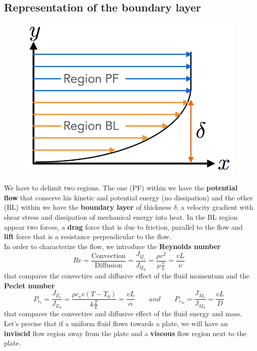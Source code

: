 \newpage
	
\subsection{Representation of the boundary layer}
\begin{figure}
	\vspace{-5mm}
	\includegraphics[scale=0.3]{ch1/11}
\end{figure}
We have to delimit two regions. The one (PF) within we have the \textbf{potential flow} that conserve his kinetic and potential energy (no dissipation) and the other (BL) within we have the \textbf{boundary layer} of thickness $\delta$, a velocity gradient with shear stress and dissipation of mechanical energy into heat. In the BL region appear two forces, a \textbf{drag} force that is due to friction, parallel to the flow and \textbf{lift} force that is a resistance perpendicular to the flow.  \\
In order to characterize the flow, we introduce the \textbf{Reynolds number}\\
\begin{equation}
	Re = \frac{\mbox{Convection}}{\mbox{Diffusion}} = \frac{J_{Q_c}}{J_{Q_d}} = \frac{\rho v^2}{\mu \frac{v}{L}} = \frac{vL}{\nu}
\end{equation}
that compares the convective and diffusive effect of the fluid momentum and the \textbf{Peclet number}
\begin{equation}
	P_{e_t} = \frac{J_{E_c}}{J_{E_d}} = \frac{\rho c_v v (T- T_0)}{k\frac{T}{L}} = \frac{vL}{\alpha} 
	\qquad and \qquad 
	P_{e_m} = \frac{J_{M_c}}{J_{M_d}} = \frac{vL}{D} 	
\end{equation}
that compares the convective and diffusive effect of the fluid energy and mass. Let's precise that if a uniform fluid flows towards a plate, we will have an \textbf{inviscid} flow region away from the plate and a \textbf{viscous} flow region next to the plate.
	
